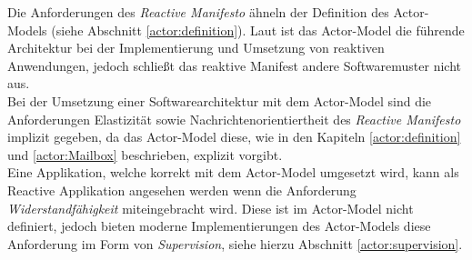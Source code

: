 Die Anforderungen des \textit{Reactive Manifesto} ähneln der Definition des Actor-Models (siehe Abschnitt \ref{actor:definition}). Laut \cite{Vernon2015ReactiveAkka} ist das Actor-Model die führende Architektur bei der Implementierung und Umsetzung von reaktiven Anwendungen, jedoch schließt das reaktive Manifest andere Softwaremuster nicht aus. \\
Bei der Umsetzung einer Softwarearchitektur mit dem Actor-Model sind die Anforderungen Elastizität sowie Nachrichtenorientiertheit des \textit{Reactive Manifesto} implizit gegeben, da das Actor-Model diese, wie in den Kapiteln \ref{actor:definition} und  \ref{actor:Mailbox} beschrieben, explizit vorgibt.\\
Eine Applikation, welche korrekt mit dem Actor-Model umgesetzt wird, kann als Reactive Applikation angesehen werden wenn die Anforderung \textit{Widerstandfähigkeit} miteingebracht wird. Diese ist im Actor-Model nicht definiert, jedoch bieten moderne Implementierungen des Actor-Models diese Anforderung im Form von \textit{Supervision}, siehe hierzu Abschnitt \ref{actor:supervision}.
